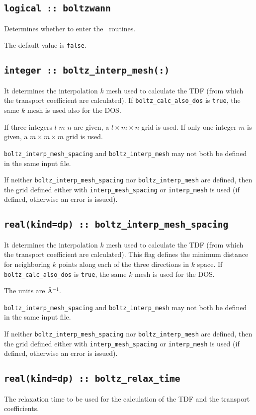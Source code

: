 \clearpage
\subsection[boltzwann]{\tt logical :: boltzwann}
Determines whether to enter the \bw\ routines.

The default value is \verb#false#.

\subsection[boltz\_interp\_mesh]{\tt integer :: boltz\_interp\_mesh(:)}
It determines the interpolation $k$ mesh used to calculate the TDF (from which the transport coefficient are calculated). If {\tt boltz\_calc\_also\_dos} is \verb#true#, the same $k$ mesh is used also for the DOS.

If three integers $l$ $m$ $n$ are given, a $l\times m\times n$ grid is used. If only one integer $m$ is given, a $m\times m\times m$ grid is used.

{\tt boltz\_interp\_mesh\_spacing} and  {\tt boltz\_interp\_mesh} may not both be defined in the same input file.

If neither {\tt boltz\_interp\_mesh\_spacing} nor  {\tt boltz\_interp\_mesh} are defined, then the grid defined either with {\tt interp\_mesh\_spacing} or {\tt interp\_mesh} is used (if defined, otherwise an error is issued).

\subsection[boltz\_interp\_mesh\_spacing]{\tt real(kind=dp) :: boltz\_interp\_mesh\_spacing}
It determines the interpolation $k$ mesh used to calculate the TDF (from which the transport coefficient are calculated). This flag defines the minimum distance for neighboring $k$ points along each of the three directions in $k$ space. If {\tt boltz\_calc\_also\_dos} is \verb#true#, the same $k$ mesh is used for the DOS.

The units are \AA$^{-1}$.

{\tt boltz\_interp\_mesh\_spacing} and  {\tt boltz\_interp\_mesh} may not both be defined in the same input file.

If neither {\tt boltz\_interp\_mesh\_spacing} nor  {\tt boltz\_interp\_mesh} are defined, then the grid defined either with {\tt interp\_mesh\_spacing} or {\tt interp\_mesh} is used (if defined, otherwise an error is issued).

\subsection[boltz\_relax\_time]{\tt real(kind=dp) :: boltz\_relax\_time}
The relaxation time to be used for the calculation of the TDF and the transport coefficients.


